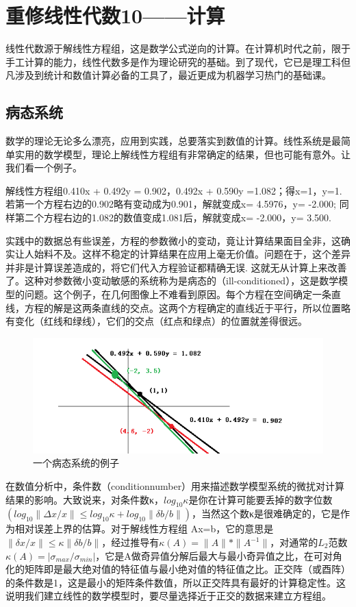 \section{重修线性代数10——计算}

线性代数源于解线性方程组，这是数学公式逆向的计算。在计算机时代之前，限于手工计算的能力，线性代数多是作为理论研究的基础。到了现代，它已是理工科但凡涉及到统计和数值计算必备的工具了，最近更成为机器学习热门的基础课。

\subsection{病态系统}

数学的理论无论多么漂亮，应用到实践，总要落实到数值的计算。线性系统是最简单实用的数学模型，理论上解线性方程组有非常确定的结果，但也可能有意外。让我们看一个例子。

\kaishu

解线性方程组0.410x + 0.492y = 0.902，0.492x + 0.590y =1.082；得x=1，y=1. 若第一个方程右边的0.902略有变动成为0.901，解就变成x= 4.5976，y= -2.000; 同样第二个方程右边的1.082的数值变成1.081后，解就变成x= -2.000，y= 3.500.

\songti

实践中的数据总有些误差，方程的参数微小的变动，竟让计算结果面目全非，这确实让人始料不及。这样不稳定的计算结果在应用上毫无价值。问题在于，这个差异并非是计算误差造成的，将它们代入方程验证都精确无误. 这就无从计算上来改善了。这种对参数微小变动敏感的系统称为是病态的（ill-conditioned），这是数学模型的问题。这个例子，在几何图像上不难看到原因。每个方程在空间确定一条直线，方程的解是这两条直线的交点。这两个方程确定的直线近于平行，所以位置略有变化（红线和绿线），它们的交点（红点和绿点）的位置就差得很远。

\begin{figure}[h]
	\centering
	\includegraphics[width=0.7\linewidth]{pic/1612386nrnueyrye6k8kq4.png}
	\caption{一个病态系统的例子}
	\label{fig:1612386nrnueyrye6k8kq4}
\end{figure}

在数值分析中，条件数（conditionnumber）用来描述数学模型系统的微扰对计算结果的影响。大致说来，对条件数κ，$ log_{10}κ $是你在计算可能要丢掉的数字位数$ (log_{10}\|Δx/x\|\leq log_{10}κ+ log_{10}\|\delta b/b\|) $，当然这个数κ是很难确定的，它是作为相对误差上界的估算。对于解线性方程组 Ax=b，它的意思是$ \|\delta x/x\| \leq κ\|\delta b/b\| $，经过推导有$ κ(A) =\|A\|*\|A^{-1}\| $，对通常的$ L_{2} $范数$ κ(A)= |\sigma_{max} /\sigma_{min}| $，它是A做奇异值分解后最大与最小奇异值之比，在可对角化的矩阵即是最大绝对值的特征值与最小绝对值的特征值之比。正交阵（或酉阵）的条件数是1，这是最小的矩阵条件数值，所以正交阵具有最好的计算稳定性。这说明我们建立线性的数学模型时，要尽量选择近于正交的数据来建立方程组。

